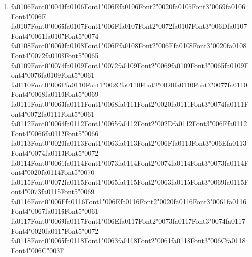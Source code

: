 \documentclass[11pt]{article}
\begin{document}
\begin{enumerate}[label=Q\arabic*., leftmargin=*]
\item {\csname fa0106Font0\endcsname\char"0049}{\csname fa0106Font1\endcsname\char"006E}{\csname fa0106Font2\endcsname\char"0020}{\csname fa0106Font3\endcsname\char"0069}{\csname fa0106Font4\endcsname\char"006E} {\csname fa0107Font0\endcsname\char"0066}{\csname fa0107Font1\endcsname\char"006F}{\csname fa0107Font2\endcsname\char"0072}{\csname fa0107Font3\endcsname\char"006D}{\csname fa0107Font4\endcsname\char"0061}{\csname fa0107Font5\endcsname\char"0074} {\csname fa0108Font0\endcsname\char"0069}{\csname fa0108Font1\endcsname\char"006F}{\csname fa0108Font2\endcsname\char"006E}{\csname fa0108Font3\endcsname\char"0020}{\csname fa0108Font4\endcsname\char"0072}{\csname fa0108Font5\endcsname\char"0065} {\csname fa0109Font0\endcsname\char"0074}{\csname fa0109Font1\endcsname\char"0072}{\csname fa0109Font2\endcsname\char"0069}{\csname fa0109Font3\endcsname\char"0065}{\csname fa0109Font4\endcsname\char"0076}{\csname fa0109Font5\endcsname\char"0061} {\csname fa0110Font0\endcsname\char"006C}{\csname fa0110Font1\endcsname\char"002C}{\csname fa0110Font2\endcsname\char"0020}{\csname fa0110Font3\endcsname\char"0077}{\csname fa0110Font4\endcsname\char"0068}{\csname fa0110Font5\endcsname\char"0069} {\csname fa0111Font0\endcsname\char"0063}{\csname fa0111Font1\endcsname\char"0068}{\csname fa0111Font2\endcsname\char"0020}{\csname fa0111Font3\endcsname\char"0074}{\csname fa0111Font4\endcsname\char"0072}{\csname fa0111Font5\endcsname\char"0061} {\csname fa0112Font0\endcsname\char"0064}{\csname fa0112Font1\endcsname\char"0065}{\csname fa0112Font2\endcsname\char"002D}{\csname fa0112Font3\endcsname\char"006F}{\csname fa0112Font4\endcsname\char"0066}{\csname fa0112Font5\endcsname\char"0066} {\csname fa0113Font0\endcsname\char"0020}{\csname fa0113Font1\endcsname\char"0063}{\csname fa0113Font2\endcsname\char"006F}{\csname fa0113Font3\endcsname\char"006E}{\csname fa0113Font4\endcsname\char"0074}{\csname fa0113Font5\endcsname\char"0072} {\csname fa0114Font0\endcsname\char"0061}{\csname fa0114Font1\endcsname\char"0073}{\csname fa0114Font2\endcsname\char"0074}{\csname fa0114Font3\endcsname\char"0073}{\csname fa0114Font4\endcsname\char"0020}{\csname fa0114Font5\endcsname\char"0070} {\csname fa0115Font0\endcsname\char"0072}{\csname fa0115Font1\endcsname\char"0065}{\csname fa0115Font2\endcsname\char"0063}{\csname fa0115Font3\endcsname\char"0069}{\csname fa0115Font4\endcsname\char"0073}{\csname fa0115Font5\endcsname\char"0069} {\csname fa0116Font0\endcsname\char"006F}{\csname fa0116Font1\endcsname\char"006E}{\csname fa0116Font2\endcsname\char"0020}{\csname fa0116Font3\endcsname\char"0061}{\csname fa0116Font4\endcsname\char"0067}{\csname fa0116Font5\endcsname\char"0061} {\csname fa0117Font0\endcsname\char"0069}{\csname fa0117Font1\endcsname\char"006E}{\csname fa0117Font2\endcsname\char"0073}{\csname fa0117Font3\endcsname\char"0074}{\csname fa0117Font4\endcsname\char"0020}{\csname fa0117Font5\endcsname\char"0072} {\csname fa0118Font0\endcsname\char"0065}{\csname fa0118Font1\endcsname\char"0063}{\csname fa0118Font2\endcsname\char"0061}{\csname fa0118Font3\endcsname\char"006C}{\csname fa0118Font4\endcsname\char"006C}{\char"003F}\\[0.25em]

\end{enumerate}
\end{document}
